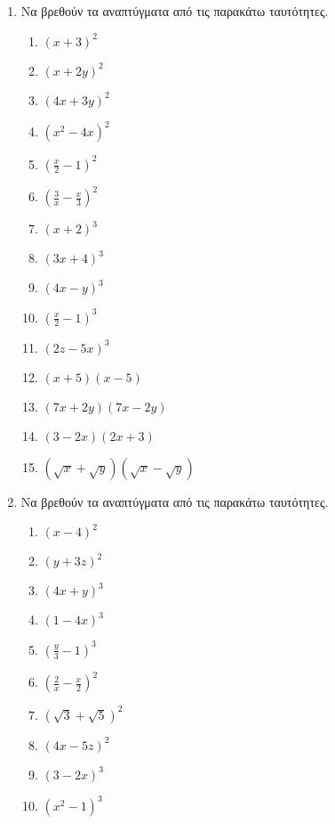 \documentclass[twoside,nofonts,internet]{askhseis}
\begin{document}
\vspace{-4mm}
\begin{enumerate}
\item Να βρεθούν τα αναπτύγματα από τις παρακάτω ταυτότητες.
\begin{multicols}{3}
\begin{enumerate}[label=\roman*.]
\item $ \left(x+3 \right)^2 $
\item $ \left(x+2y \right)^2 $
\item $ \left(4x+3y \right)^2 $
\item $ \left(x^2-4x \right)^2 $
\item $ \left(\frac{x}{2}-1 \right)^2 $
\item $ \left(\frac{3}{x}-\frac{x}{3} \right)^2 $
\item $ \left(x+2 \right)^3 $
\item $ \left(3x+4 \right)^3 $
\item $ \left(4x-y \right)^3 $
\item $ \left(\frac{x}{2}-1 \right)^3  $
\item $ (2z-5x)^3 $
\item $ (x+5)(x-5) $
\item $ (7x+2y)(7x-2y) $
\item $ (3-2x)(2x+3) $
\item $ \left(\sqrt{x}+\sqrt{y}\right)\left(\sqrt{x}-\sqrt{y}\right) $
\end{enumerate}
\end{multicols}
\item Να βρεθούν τα αναπτύγματα από τις παρακάτω ταυτότητες.
\begin{multicols}{3}
\begin{enumerate}[label=\roman*.]
\item $ \left(x-4 \right)^2 $
\item $ \left(y+3z\right)^2 $
\item $ \left(4x+y \right)^3 $
\item $ \left(1-4x \right)^3 $
\item $ \left(\frac{y}{3}-1 \right)^3 $
\item $ \left(\frac{2}{x}-\frac{x}{2} \right)^2 $
\item $ \left(\sqrt{3}+\sqrt{5}\right)^2 $
\item $ \left(4x-5z\right)^2 $
\item $ \left(3-2x \right)^3 $
\item $ \left(x^2-1 \right)^3  $

\end{enumerate}
\end{multicols}
\end{enumerate}
\end{document}
